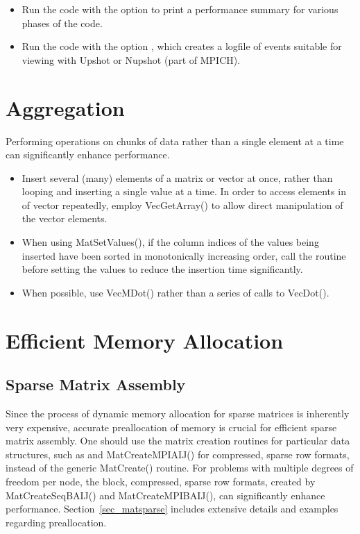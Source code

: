 {{\begin{itemize}
\item Run the code with the option  to print a performance
   summary for various phases of the code. 

\item Run the code with the option  \trl{[logfilename]}, which creates a
   logfile of events suitable for viewing with Upshot or Nupshot (part of
   MPICH). 

\end{itemize}

\section{Aggregation}

Performing operations on chunks of data rather than a single element
at a time can significantly enhance performance.  
\begin{itemize}
\item Insert several (many) elements of a matrix or vector at once, rather 
   than looping and inserting a single value at a time.  In order to
   access elements in of vector repeatedly, employ {VecGetArray()} to allow 
   direct manipulation of the vector elements. 

\item When using MatSetValues(), if the column indices of the values being
   inserted have been sorted in monotonically increasing order, call
   the routine  before setting the values
   to reduce the insertion time significantly.

\item When possible, use VecMDot() rather than a series of calls to VecDot().
\end{itemize}

\section{Efficient Memory Allocation}
\label{sec_perf_memory}

\subsection{Sparse Matrix Assembly}

Since the process of dynamic memory allocation for sparse matrices is
inherently very expensive, accurate preallocation of memory is crucial
for efficient sparse matrix assembly.  One should use the matrix creation
routines for particular data structures, such as  and MatCreateMPIAIJ() for compressed, sparse
row formats, instead of the generic MatCreate() routine.  For
problems with multiple degrees of freedom per node, the block,
compressed, sparse row formats, created by MatCreateSeqBAIJ()
and MatCreateMPIBAIJ(), can significantly enhance performance.
Section~\ref{sec_matsparse} includes extensive details and
examples regarding preallocation.

}}
